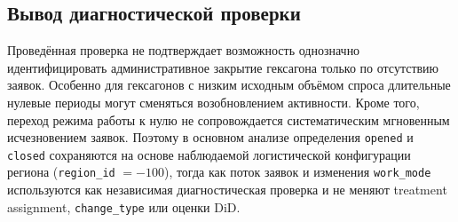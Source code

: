 \documentclass[14pt,a4paper]{extarticle}
\begin{document}
\subsection{Вывод диагностической проверки}

Проведённая проверка не подтверждает возможность однозначно идентифицировать административное закрытие гексагона только по отсутствию заявок. Особенно для гексагонов с низким исходным объёмом спроса длительные нулевые периоды могут сменяться возобновлением активности. Кроме того, переход режима работы к нулю не сопровождается систематическим мгновенным исчезновением заявок. Поэтому в основном анализе определения \texttt{opened} и \texttt{closed} сохраняются на основе наблюдаемой логистической конфигурации региона (\texttt{region\_id} \(= -100\)), тогда как поток заявок и изменения \texttt{work\_mode} используются как независимая диагностическая проверка и не меняют treatment assignment, \texttt{change\_type} или оценки DiD.
\end{document}
